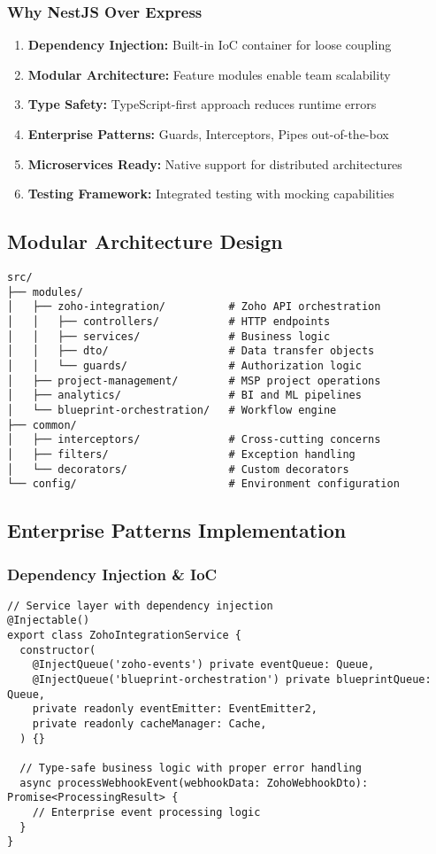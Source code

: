 \subsubsection{Why NestJS Over Express}
\begin{enumerate}
\item \textbf{Dependency Injection:} Built-in IoC container for loose coupling
\item \textbf{Modular Architecture:} Feature modules enable team scalability
\item \textbf{Type Safety:} TypeScript-first approach reduces runtime errors
\item \textbf{Enterprise Patterns:} Guards, Interceptors, Pipes out-of-the-box
\item \textbf{Microservices Ready:} Native support for distributed architectures
\item \textbf{Testing Framework:} Integrated testing with mocking capabilities
\end{enumerate}

\subsection{Modular Architecture Design}
\begin{verbatim}
src/
├── modules/
│   ├── zoho-integration/          # Zoho API orchestration
│   │   ├── controllers/           # HTTP endpoints
│   │   ├── services/              # Business logic
│   │   ├── dto/                   # Data transfer objects
│   │   └── guards/                # Authorization logic
│   ├── project-management/        # MSP project operations
│   ├── analytics/                 # BI and ML pipelines
│   └── blueprint-orchestration/   # Workflow engine
├── common/
│   ├── interceptors/              # Cross-cutting concerns
│   ├── filters/                   # Exception handling
│   └── decorators/                # Custom decorators
└── config/                        # Environment configuration
\end{verbatim}

\subsection{Enterprise Patterns Implementation}

\subsubsection{Dependency Injection \& IoC}
\begin{verbatim}
// Service layer with dependency injection
@Injectable()
export class ZohoIntegrationService {
  constructor(
    @InjectQueue('zoho-events') private eventQueue: Queue,
    @InjectQueue('blueprint-orchestration') private blueprintQueue: Queue,
    private readonly eventEmitter: EventEmitter2,
    private readonly cacheManager: Cache,
  ) {}
  
  // Type-safe business logic with proper error handling
  async processWebhookEvent(webhookData: ZohoWebhookDto): Promise<ProcessingResult> {
    // Enterprise event processing logic
  }
}
\end{verbatim}

